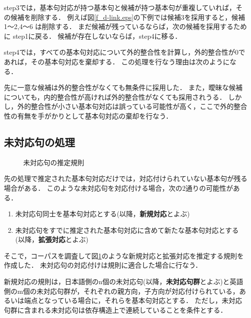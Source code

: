 step3では，基本句対応が持つ基本句と候補が持つ基本句が重複していれば，その候補を削除する．
例えば図\ref{f_d-link.eps}の下例では候補3を採用すると，候補1〜2,4〜6 は削除する．
まだ候補が残っているならば，次の候補を採用するために step1に戻る．
候補が存在しないならば，step4に移る．


step4では，すべての基本句対応について外的整合性を計算し，外的整合性が0であれば，その基本句対応を棄却する．
この処理を行なう理由は次のようになる．

先に一意な候補は外的整合性がなくても無条件に採用した．
また，曖昧な候補についても，内的整合性が高ければ外的整合性がなくても採用されうる．
しかし，外的整合性が小さい基本句対応は誤っている可能性が高く，ここで外的整合性の有無を手がかりとして基本句対応の棄却を行なう．






\subsection{未対応句の処理}

\begin{figure}
\begin{center}
 \leavevmode
 \epsfxsize=14cm
 \epsfysize=8.2cm
\end{center}
\caption{未対応句の推定規則}
\label{f_kisoku.eps}
\end{figure}



先の処理で推定された基本句対応だけでは，対応付けられていない基本句が残る場合がある．
このような未対応句を対応付ける場合，次の2通りの可能性がある．

\vspace{1ex}
\begin{enumerate}
	\item 未対応句同士を基本句対応とする(以降，{\bf 新規対応}とよぶ)
	\item 未対応句をすでに推定された基本句対応に含めて新たな基本句対応とする(以降，{\bf 拡張対応}とよぶ)
\end{enumerate}
\vspace{1ex}

そこで，コーパスを調査して図\ref{f_kisoku.eps}のような新規対応と拡張対応を推定する規則を作成した．
未対応句の対応付けは規則に適合した場合に行なう．

新規対応の規則は，日本語側のn個の未対応句(以降，{\bf 未対応句群}とよぶ)と英語側のm個の未対応句群が，それぞれの親方向，子方向が対応付けられている，あるいは端点となっている場合に，それらを基本句対応とする．
ただし，未対応句群に含まれる未対応句は依存構造上で連続していることを条件とする．




